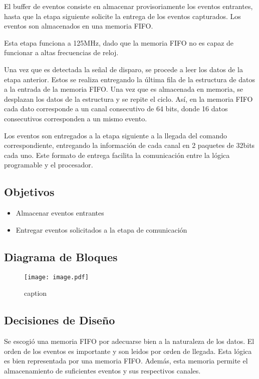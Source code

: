 El buffer de eventos consiste en almacenar provisoriamente los eventos entrantes, hasta que la etapa siguiente solicite la entrega de los eventos capturados. Los eventos son almacenados en una memoria FIFO.

Esta etapa funciona a 125MHz, dado que la memoria FIFO no es capaz de funcionar a altas frecuencias de reloj.

Una vez que es detectada la señal de disparo, se procede a leer los datos de la etapa anterior. Estos se realiza entregando la última fila de la estructura de datos a la entrada de la memoria FIFO. Una vez que es almacenada en memoria, se desplazan los datos de la estructura y se repite el ciclo. Así, en la memoria FIFO cada dato corresponde a un canal consecutivo de 64 bits, donde 16 datos consecutivos corresponden a un mismo evento.

Los eventos son entregados a la etapa siguiente a la llegada del comando correspondiente, entregando la información de cada canal en 2 paquetes de 32bits cada uno. Este formato de entrega facilita la comunicación entre la lógica programable y el procesador.

\subsection{Objetivos}
\begin{itemize}
	\item Almacenar eventos entrantes
	\item Entregar eventos solicitados a la etapa de comunicación
\end{itemize}

\subsection{Diagrama de Bloques}

\begin{figure}[H]
	\centering
	\texttt{[image: image.pdf]}
	\caption{caption}
	\label{fig:}
\end{figure}

\subsection{Decisiones de Diseño}

Se escogió una memoria FIFO por adecuarse bien a la naturaleza de los datos. El orden de los eventos es importante y son leidos por orden de llegada. Esta lógica es bien representada por una memoria FIFO. Además, esta memoria permite el almacenamiento de suficientes eventos y sus respectivos canales. %

